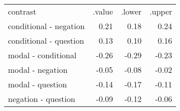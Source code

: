 \begin{tabular}{lrrr}
 contrast & .value & .lower & .upper \\ 
 conditional - negation & 0.21 & 0.18 & 0.24 \\ 
  conditional - question & 0.13 & 0.10 & 0.16 \\ 
  modal - conditional & -0.26 & -0.29 & -0.23 \\ 
  modal - negation & -0.05 & -0.08 & -0.02 \\ 
  modal - question & -0.14 & -0.17 & -0.11 \\ 
  negation - question & -0.09 & -0.12 & -0.06 \\ 
  \end{tabular}

